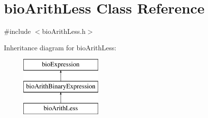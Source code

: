 \hypertarget{classbio_arith_less}{}\section{bio\+Arith\+Less Class Reference}
\label{classbio_arith_less}


{\ttfamily \#include $<$bio\+Arith\+Less.\+h$>$}

Inheritance diagram for bio\+Arith\+Less\+:\begin{figure}[H]
\begin{center}
\leavevmode
\includegraphics[height=3.000000cm]{classbio_arith_less}
\end{center}
\end{figure}
